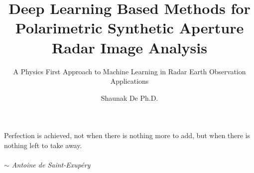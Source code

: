 \documentclass[fontsize=14pt,a4paper,DIV=9,twoside,chapterprefix=on,final]{scrbook}
\begin{document}
\title{Deep Learning Based Methods for Polarimetric Synthetic Aperture Radar Image Analysis}
\subtitle{A Physics First Approach to Machine Learning in Radar Earth Observation Applications}
\author{Shaunak De \small{Ph.D.}}
\date{}
\publishers{2018}

\dedication{ \normalsize{ Dedicated to human curiosity, with its relentless pursuit for answers. \\~\\ And in particular, to my own constant partner in discovery. } }
\maketitle  

 


\begin{titlepage}


\vspace*{\fill}\normalsize{\noindent Perfection is achieved, not when there is nothing more to add, but when there is nothing left to take away.\\~\\
\hfill \textit{$\sim$ Antoine de Saint-Exup\'ery}}
\vspace*{\fill}




\end{titlepage}

%
\end{document}
